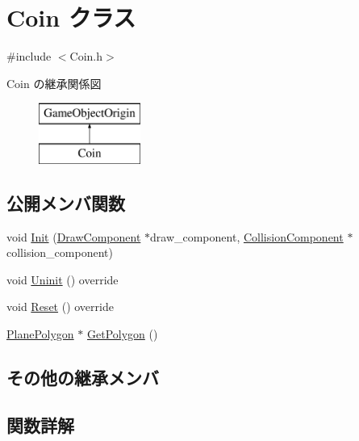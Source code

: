 \hypertarget{class_coin}{}\section{Coin クラス}
\label{class_coin}


{\ttfamily \#include $<$Coin.\+h$>$}

Coin の継承関係図\begin{figure}[H]
\begin{center}
\leavevmode
\includegraphics[height=2.000000cm]{class_coin}
\end{center}
\end{figure}
\subsection*{公開メンバ関数}
\begin{DoxyCompactItemize}
\item 
void \mbox{\hyperlink{class_coin_a434dff8fe630ca5155ef54d9dd5fac8b}{Init}} (\mbox{\hyperlink{class_draw_component}{Draw\+Component}} $\ast$draw\+\_\+component, \mbox{\hyperlink{class_collision_component}{Collision\+Component}} $\ast$collision\+\_\+component)
\item 
void \mbox{\hyperlink{class_coin_a4d364dcb4b57b80ea00ce931d0bb300f}{Uninit}} () override
\item 
void \mbox{\hyperlink{class_coin_a52c50229ce7c1e0f459e198adac70c8d}{Reset}} () override
\item 
\mbox{\hyperlink{class_plane_polygon}{Plane\+Polygon}} $\ast$ \mbox{\hyperlink{class_coin_af435ca01cc92d7214e7bc94ed486ab7b}{Get\+Polygon}} ()
\end{DoxyCompactItemize}
\subsection*{その他の継承メンバ}


\subsection{関数詳解}
\mbox{\label{class_coin_af435ca01cc92d7214e7bc94ed486ab7b}} 
